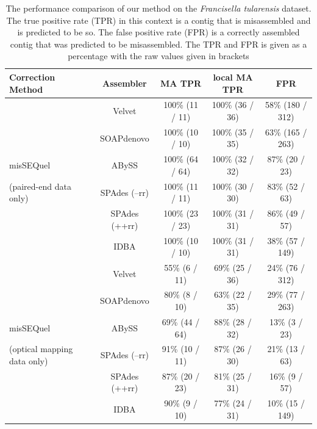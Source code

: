 \documentclass[doctor]{thesis}
\begin{document}
\begin{table}[h!]
\begin{center}
\caption{The performance comparison of our method on the \emph{Francisella tularensis} dataset. 
The true positive rate (TPR) in this context is a contig that is misassembled and is predicted to be so. 
The false positive rate (FPR) is a correctly assembled contig that was predicted to be misassembled.
The TPR and FPR is given as a percentage with the raw values given in brackets}
{\setlength{\tabcolsep}{1em}
\begin{tabular}{|l|c|c|c|c|}
\hline
\textbf{Correction Method}								& \textbf{Assembler}		&{\bf MA TPR}			& {\bf local MA TPR}		& \textbf{FPR}	\\ \hline
							& Velvet				& 100\% (11 / 11)		& 100\% (36 / 36)		& 58\% (180 / 312)		\\ 
							& SOAPdenovo		& 100\% (10 / 10)		& 100\% (35 / 35)		& 63\% (165 / 263)	\\ 
 misSEQuel								& ABySS				& 100\% (64 / 64)		& 100\% (32 / 32)		& 87\% (20 / 23)			\\ 
(paired-end data only)				& SPAdes (--rr)			& 100\% (11 / 11)		& 100\% (30 / 30)		& 83\% (52 / 63)		\\ 
							& SPAdes (++rr)		& 100\% (23 / 23)		& 100\% (31 / 31)		& 86\% (49 / 57)		\\ 
							& IDBA				& 100\% (10 / 10)		& 100\% (31 / 31)		& 38\% (57 / 149) \\ \hline \hline
				
							& Velvet				& 55\% (6 / 11)			& 69\% (25 / 36)			& 24\% (76 / 312)	\\ 
							& SOAPdenovo		& 80\% (8 / 10)			& 63\% (22 / 35)			& 29\% (77 / 263)	\\ 
misSEQuel					& ABySS				& 69\% (44 / 64)		& 88\% (28 / 32)			& 13\% (3 / 23)		\\ 
(optical mapping data only)		& SPAdes (--rr)			& 91\% (10 / 11)		& 87\% (26 / 30)			& 21\% (13 / 63)		\\ 
							& SPAdes (++rr)		& 87\% (20 / 23)		& 81\% (25 / 31)			& 16\% (9 / 57)			\\ 
							& IDBA				& 90\% (9 / 10)			& 77\% (24 / 31)			& 10\% (15 / 149)		\\ 
\hline \hline
					

\end{tabular}}
\end{center}
\end{table}
\end{document}
